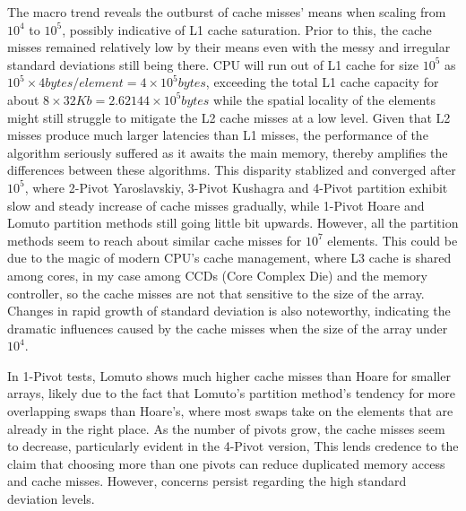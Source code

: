 \documentclass{article}
\begin{document}
The macro trend reveals the outburst of cache misses' means when scaling from $10^4$ to $10^5$, possibly indicative of L1 cache saturation.
Prior to this, the cache misses remained relatively low by their means even with the messy and irregular standard deviations still being there.
CPU will run out of L1 cache for size $10^5$ as $10^5 \times 4 {bytes} / element = 4 \times 10^5 {bytes}$, exceeding the total L1 cache capacity for about $8 \times 32Kb = 2.62144 \times 10^5 bytes$ while the spatial locality of the elements might still struggle to mitigate the L2 cache misses at a low level.
Given that L2 misses produce much larger latencies than L1 misses, the performance of the algorithm seriously suffered as it awaits the main memory, thereby amplifies the differences between these algorithms. This disparity stablized and converged after $10^5$, where 2-Pivot Yaroslavskiy, 3-Pivot Kushagra and 4-Pivot partition
exhibit slow and steady increase of cache misses gradually, while 1-Pivot Hoare and Lomuto partition methods still going little bit upwards. However, all the partition methods seem to reach about similar cache misses for $10^7$ elements. This could be due to the magic of modern CPU's cache management, where L3 cache is shared among cores,
in my case among CCDs (Core Complex Die) and the memory controller, so the cache misses are not that sensitive to the size of the array.
Changes in rapid growth of standard deviation is also noteworthy, indicating the dramatic influences caused by the cache misses when the size of the array under $10^4$.

In 1-Pivot tests, Lomuto shows much higher cache misses than Hoare for smaller arrays, likely due to the fact that Lomuto's partition method's tendency for more overlapping swaps than Hoare's,
where most swaps take on the elements that are already in the right place. As the number of pivots grow, the cache misses seem to decrease, particularly evident in the 4-Pivot version,
This lends credence to the claim that choosing more than one pivots can reduce duplicated memory access and cache misses. However, concerns persist regarding the high standard deviation levels.
\end{document}
